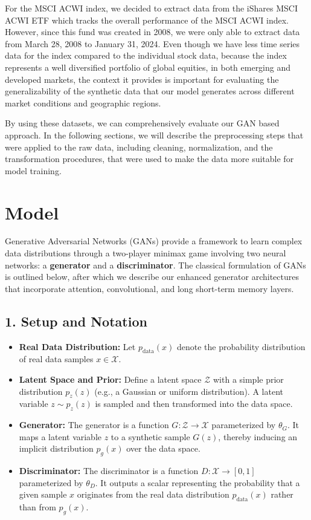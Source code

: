 \documentclass{article}
\begin{document}
For the MSCI ACWI index, we decided to extract data from the iShares MSCI ACWI ETF which tracks the overall performance of the MSCI ACWI index. However, since this fund was created in 2008, we were only able to extract data from March 28, 2008 to January 31, 2024. Even though we have less time series data for the index compared to the individual stock data, because the index represents a well diversified portfolio of global equities, in both emerging and developed markets, the context it provides is important for evaluating the generalizability of the synthetic data that our model generates across different market conditions and geographic regions.

By using these datasets, we can comprehensively evaluate our GAN based approach. In the following sections, we will describe the preprocessing steps that were applied to the raw data, including cleaning, normalization, and the transformation procedures, that were used to make the data more suitable for model training.

\section{Model}

Generative Adversarial Networks (GANs) provide a framework to learn complex data distributions through a two-player minimax game involving two neural networks: a \textbf{generator} and a \textbf{discriminator}. The classical formulation of GANs is outlined below, after which we describe our enhanced generator architectures that incorporate attention, convolutional, and long short-term memory layers.

\subsection*{1. Setup and Notation}

\begin{itemize}
    \item \textbf{Real Data Distribution:} Let $p_{\text{data}}(x)$ denote the probability distribution of real data samples $x \in \mathcal{X}$.
    \item \textbf{Latent Space and Prior:} Define a latent space $\mathcal{Z}$ with a simple prior distribution $p_z(z)$ (e.g., a Gaussian or uniform distribution). A latent variable $z \sim p_z(z)$ is sampled and then transformed into the data space.
    \item \textbf{Generator:} The generator is a function $G: \mathcal{Z} \to \mathcal{X}$ parameterized by $\theta_G$. It maps a latent variable $z$ to a synthetic sample $G(z)$, thereby inducing an implicit distribution $p_g(x)$ over the data space.
    \item \textbf{Discriminator:} The discriminator is a function $D: \mathcal{X} \to [0,1]$ parameterized by $\theta_D$. It outputs a scalar representing the probability that a given sample $x$ originates from the real data distribution $p_{\text{data}}(x)$ rather than from $p_g(x)$.
\end{itemize}
\end{document}
